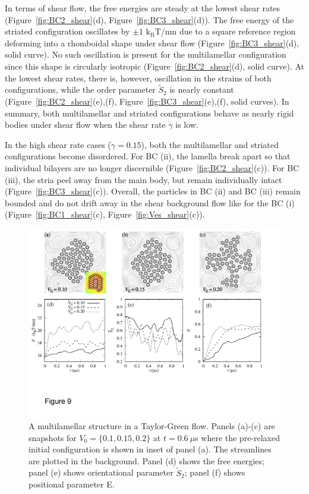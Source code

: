 \documentclass[prb,preprint,showpacs,preprintnumbers,amsmath,amssymb,longbibliography]{revtex4-1}
\begin{document}
In terms of shear flow, the free energies are steady at the lowest shear
rates (Figure~\ref{fig:BC2_shear}(d), Figure~\ref{fig:BC3_shear}(d)).
The free energy of the striated configuration oscillates by $\pm 1$
$\mathrm{k_BT}$/nm due to a square reference region deforming into a
rhomboidal shape under shear flow (Figure~\ref{fig:BC3_shear}(d), solid
curve). No such oscillation is present for the multilamellar
configuration since this shape is circularly isotropic
(Figure~\ref{fig:BC2_shear}(d), solid curve). At the lowest shear rates,
there is, however, oscillation in the strains of both configurations,
while the order parameter $\tilde S_2$ is nearly constant
(Figure~\ref{fig:BC2_shear}(e),(f), Figure~\ref{fig:BC3_shear}(e),(f),
solid curves). In summary, both multilamellar and striated
configurations behave as nearly rigid bodies under shear flow when the
shear rate $\dot \gamma$ is low.

In the high shear rate cases ($\dot\gamma=0.15$), both the multilamellar
and striated configurations become disordered. For BC (ii), the lamella
break apart so that individual bilayers are no longer discernible
(Figure~\ref{fig:BC2_shear}(c)). For BC (iii), the stria peel away from
the main body, but remain individually intact
(Figure~\ref{fig:BC3_shear}(c)). Overall, the particles in BC (ii) and
BC (iii) remain bounded and do not drift away in the shear background
flow like for the BC (i) (Figure~\ref{fig:BC1_shear}(c),
Figure~\ref{fig:Ves_shear}(c)).


\begin{figure}
  \begin{center}
\includegraphics[width=1.0\textwidth]{Figures/Figure9.pdf} 
  \end{center}
  \vspace{-20pt}
  \caption{\label{fig:BC2_TG} A multilamellar structure in a
  Taylor-Green flow. Panels (a)-(c) are snapshots for $V_0 = \{0.1,
  0.15, 0.2\}$ at $t=0.6\ \mu$s where the pre-relaxed initial
  configuration is shown in inset of panel (a). The streamlines are
  plotted in the background. Panel (d) shows the free energies; panel
  (e) shows orientational parameter $\tilde{S}_2$; panel (f) shows
  positional parameter E.}
\end{figure}
\end{document}

